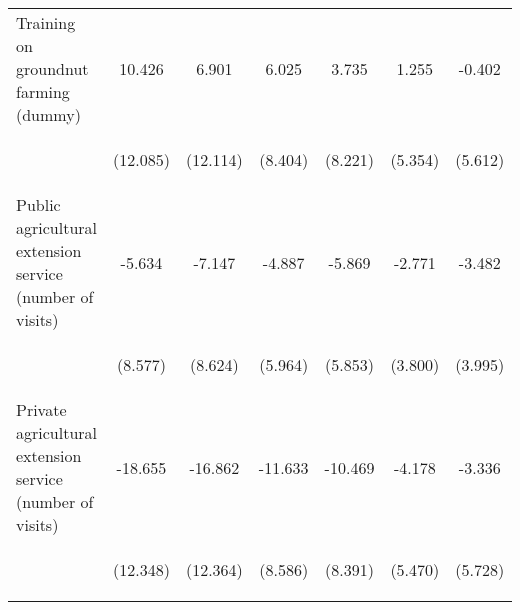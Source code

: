 \begin{center}
\begin{tabular}{lcccccc}
Training on groundnut farming (dummy) & 10.426 & 6.901 & 6.025 & 3.735 & 1.255 & -0.402 \\
\vspace{4pt} & \begin{footnotesize}(12.085)\end{footnotesize} & \begin{footnotesize}(12.114)\end{footnotesize} & \begin{footnotesize}(8.404)\end{footnotesize} & \begin{footnotesize}(8.221)\end{footnotesize} & \begin{footnotesize}(5.354)\end{footnotesize} & \begin{footnotesize}(5.612)\end{footnotesize} \\
Public agricultural extension service (number of visits) & -5.634 & -7.147 & -4.887 & -5.869 & -2.771 & -3.482 \\
\vspace{4pt} & \begin{footnotesize}(8.577)\end{footnotesize} & \begin{footnotesize}(8.624)\end{footnotesize} & \begin{footnotesize}(5.964)\end{footnotesize} & \begin{footnotesize}(5.853)\end{footnotesize} & \begin{footnotesize}(3.800)\end{footnotesize} & \begin{footnotesize}(3.995)\end{footnotesize} \\
Private agricultural extension service (number of visits) & -18.655 & -16.862 & -11.633 & -10.469 & -4.178 & -3.336 \\
\vspace{4pt} & \begin{footnotesize}(12.348)\end{footnotesize} & \begin{footnotesize}(12.364)\end{footnotesize} & \begin{footnotesize}(8.586)\end{footnotesize} & \begin{footnotesize}(8.391)\end{footnotesize} & \begin{footnotesize}(5.470)\end{footnotesize} & \begin{footnotesize}(5.728)\end{footnotesize} \\

\end{tabular}
\end{center}

